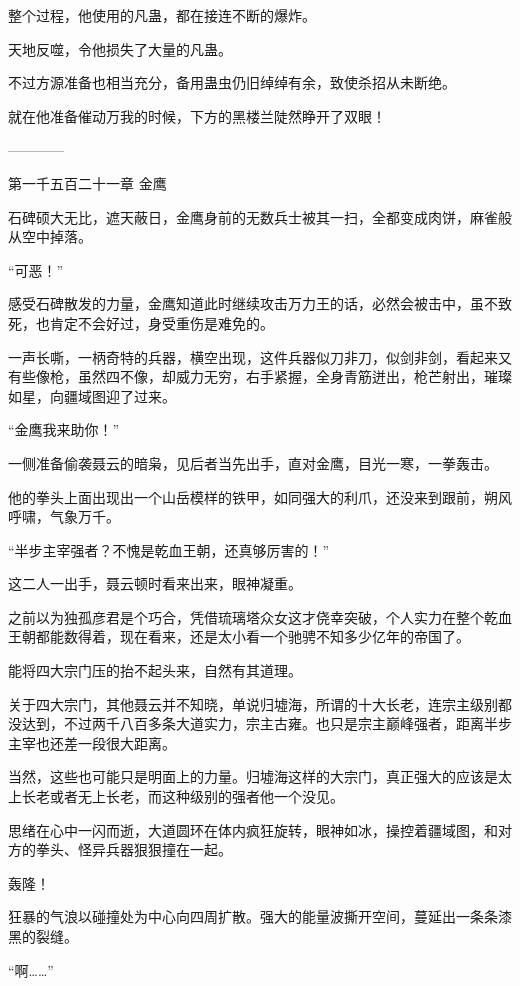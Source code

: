 \begin{this_body}
整个过程，他使用的凡蛊，都在接连不断的爆炸。

天地反噬，令他损失了大量的凡蛊。

不过方源准备也相当充分，备用蛊虫仍旧绰绰有余，致使杀招从未断绝。

就在他准备催动万我的时候，下方的黑楼兰陡然睁开了双眼！

------------

第一千五百二十一章 金鹰

石碑硕大无比，遮天蔽日，金鹰身前的无数兵士被其一扫，全都变成肉饼，麻雀般从空中掉落。

“可恶！”

感受石碑散发的力量，金鹰知道此时继续攻击万力王的话，必然会被击中，虽不致死，也肯定不会好过，身受重伤是难免的。

一声长嘶，一柄奇特的兵器，横空出现，这件兵器似刀非刀，似剑非剑，看起来又有些像枪，虽然四不像，却威力无穷，右手紧握，全身青筋迸出，枪芒射出，璀璨如星，向疆域图迎了过来。

“金鹰我来助你！”

一侧准备偷袭聂云的暗枭，见后者当先出手，直对金鹰，目光一寒，一拳轰击。

他的拳头上面出现出一个山岳模样的铁甲，如同强大的利爪，还没来到跟前，朔风呼啸，气象万千。

“半步主宰强者？不愧是乾血王朝，还真够厉害的！”

这二人一出手，聂云顿时看来出来，眼神凝重。

之前以为独孤彦君是个巧合，凭借琉璃塔众女这才侥幸突破，个人实力在整个乾血王朝都能数得着，现在看来，还是太小看一个驰骋不知多少亿年的帝国了。

能将四大宗门压的抬不起头来，自然有其道理。

关于四大宗门，其他聂云并不知晓，单说归墟海，所谓的十大长老，连宗主级别都没达到，不过两千八百多条大道实力，宗主古雍。也只是宗主巅峰强者，距离半步主宰也还差一段很大距离。

当然，这些也可能只是明面上的力量。归墟海这样的大宗门，真正强大的应该是太上长老或者无上长老，而这种级别的强者他一个没见。

思绪在心中一闪而逝，大道圆环在体内疯狂旋转，眼神如冰，操控着疆域图，和对方的拳头、怪异兵器狠狠撞在一起。

轰隆！

狂暴的气浪以碰撞处为中心向四周扩散。强大的能量波撕开空间，蔓延出一条条漆黑的裂缝。

“啊……”


\end{this_body}
